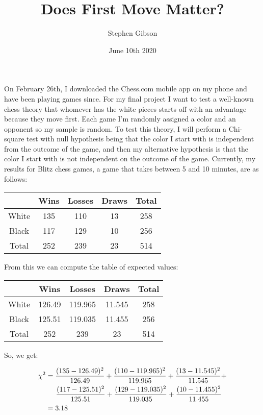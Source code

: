 \documentclass[letterpaper, 11pt]{article}
\title{Does First Move Matter?}
\author{Stephen Gibson}
\date{June 10th 2020}
\begin{document}
\maketitle

On February 26th, I downloaded the Chess.com mobile app on my phone and have been playing games since. For my final project I want to test a well-known chess theory that whomever has the white pieces starts off with an advantage because they move first. Each game I’m randomly assigned a color and an opponent so my sample is random. To test this theory, I will perform a Chi-square test with null hypothesis being that the color I start with is independent from the outcome of the game, and then my alternative hypothesis is that the color I start with is not independent on the outcome of the game. Currently, my results for Blitz chess games, a game that takes between 5 and 10 minutes, are as follows:

\begin{center}

\begin{tabular}{ |c|c|c|c|c| } 
 \hline
 & Wins & Losses & Draws & Total\\
 \hline
 White & 135 & 110 & 13 & 258\\
 \hline
 Black & 117 & 129 & 10 & 256\\
 \hline
 Total & 252 & 239 & 23 & 514\\
 \hline
\end{tabular}

\end{center}

From this we can compute the table of expected values:

\begin{center}

\begin{tabular}{ |c|c|c|c|c| } 
 \hline
 & Wins & Losses & Draws & Total\\
 \hline
 White & 126.49 & 119.965 & 11.545 & 258\\
 \hline
 Black & 125.51 & 119.035 & 11.455 & 256\\
 \hline
 Total & 252 & 239 & 23 & 514\\
 \hline
\end{tabular}

\end{center}

So, we get:

\begin{align*}
\chi^2 & = \frac{(135 - 126.49)^2}{126.49} + \frac{(110 - 119.965)^2}{119.965} + \frac{(13 - 11.545)^2}{11.545} +\\
& \hspace{0.5cm} \frac{(117 - 125.51)^2}{125.51} + \frac{(129 - 119.035)^2}{119.035} + \frac{(10 - 11.455)^2}{11.455}\\
 & = 3.18
\end{align*}
\end{document}
